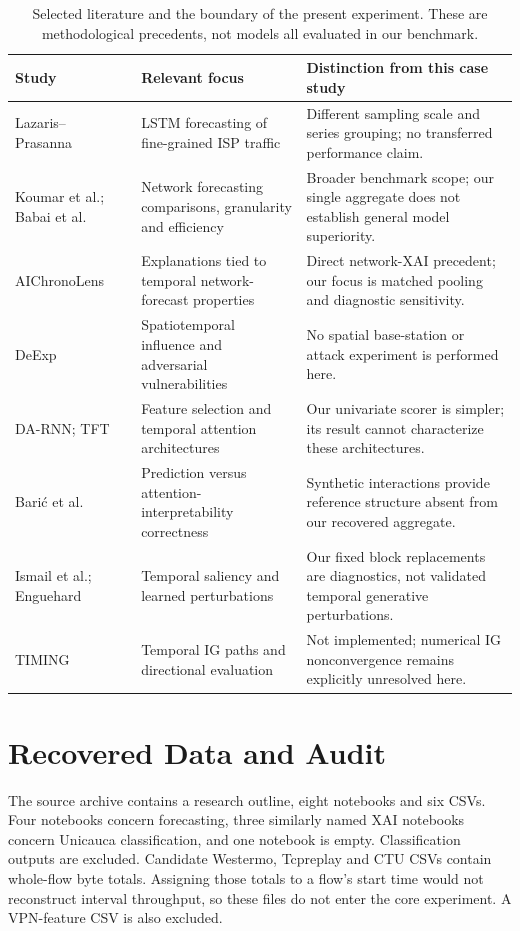 \documentclass[conference]{IEEEtran}
\begin{document}
\begin{table}[t]
\caption{Selected literature and the boundary of the present experiment. These are methodological precedents, not models all evaluated in our benchmark.}
\label{tab:literature}\centering\footnotesize
\begin{tabular}{p{3.3cm}p{5.1cm}p{8.0cm}}\toprule
Study & Relevant focus & Distinction from this case study\\\midrule
Lazaris--Prasanna~\cite{network_lstm} & LSTM forecasting of fine-grained ISP traffic & Different sampling scale and series grouping; no transferred performance claim.\\
Koumar et al.; Babai et al.~\cite{cesnet_comparison,which_deep} & Network forecasting comparisons, granularity and efficiency & Broader benchmark scope; our single aggregate does not establish general model superiority.\\
AIChronoLens~\cite{aichronolens,aichronolens_journal} & Explanations tied to temporal network-forecast properties & Direct network-XAI precedent; our focus is matched pooling and diagnostic sensitivity.\\
DeExp~\cite{deexp} & Spatiotemporal influence and adversarial vulnerabilities & No spatial base-station or attack experiment is performed here.\\
DA-RNN; TFT~\cite{darnn,tft} & Feature selection and temporal attention architectures & Our univariate scorer is simpler; its result cannot characterize these architectures.\\
Bari\'c et al.~\cite{attention_benchmark} & Prediction versus attention-interpretability correctness & Synthetic interactions provide reference structure absent from our recovered aggregate.\\
Ismail et al.; Enguehard~\cite{ts_benchmark,learned_perturbations} & Temporal saliency and learned perturbations & Our fixed block replacements are diagnostics, not validated temporal generative perturbations.\\
TIMING~\cite{timing} & Temporal IG paths and directional evaluation & Not implemented; numerical IG nonconvergence remains explicitly unresolved here.\\\bottomrule
\end{tabular}
\end{table}

\section{Recovered Data and Audit}
The source archive contains a research outline, eight notebooks and six CSVs. Four notebooks concern forecasting, three similarly named XAI notebooks concern Unicauca classification, and one notebook is empty. Classification outputs are excluded. Candidate Westermo, Tcpreplay and CTU CSVs contain whole-flow byte totals. Assigning those totals to a flow's start time would not reconstruct interval throughput, so these files do not enter the core experiment. A VPN-feature CSV is also excluded.
\end{document}
